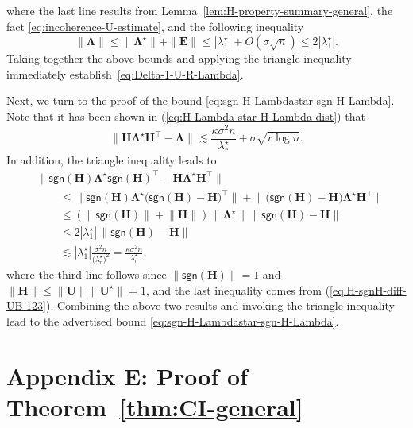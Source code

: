 %
where the last line results from Lemma~\ref{lem:H-property-summary-general}, the fact \eqref{eq:incoherence-U-estimate}, and the following inequality
%
\begin{equation}
	\|\bm{\Lambda}\| \leq \|\bm{\Lambda}^{\star}\| + \|\bm{E}\|\leq |\lambda_1^{\star}| + O(\sigma\sqrt{n}) \leq 2|\lambda_1^{\star}|. 
	\label{eq:Lambda-norm-upper-bound}
\end{equation}
%
Taking together the above bounds and applying the triangle inequality 
immediately establish~\eqref{eq:Delta-1-U-R-Lambda}. 







Next, we turn to the proof of the bound \eqref{eq:sgn-H-Lambdastar-sgn-H-Lambda}. 
Note that it has been shown in (\ref{eq:H-Lambda-star-H-Lambda-dist}) that
%
\[
\big\|\bm{H}\bm{\Lambda}^{\star}\bm{H}^{\top}-\bm{\Lambda}\big\|\lesssim\frac{\kappa\sigma^{2}n}{\lambda_{r}^{\star}}+\sigma\sqrt{r\log n}.
\]
%
In addition, the triangle inequality leads to
%
\begin{align*}
 & \big\|\mathsf{sgn}(\bm{H})\bm{\Lambda}^{\star}\mathsf{sgn}(\bm{H})^{\top}-\bm{H}\bm{\Lambda}^{\star}\bm{H}^{\top}\big\|\\
 & \qquad\leq\big\|\mathsf{sgn}(\bm{H})\bm{\Lambda}^{\star}\big(\mathsf{sgn}(\bm{H})-\bm{H}\big)^{\top}\big\|+\big\|\big(\mathsf{sgn}(\bm{H})-\bm{H}\big)\bm{\Lambda}^{\star}\bm{H}^{\top}\big\|\\
 & \qquad\leq\left(\big\|\mathsf{sgn}(\bm{H})\big\|+\big\|\bm{H}\big\|\right)\,\big\|\bm{\Lambda}^{\star}\big\|\,\big\|\mathsf{sgn}(\bm{H})-\bm{H}\big\|\\
 & \qquad\leq  2 |\lambda_{1}^{\star}| \, \big\|\mathsf{sgn}(\bm{H})-\bm{H}\big\|\\
 & \qquad\lesssim |\lambda_{1}^{\star}| \frac{\sigma^{2}n}{\big(\lambda_{r}^{\star}\big)^{2}}=\frac{\kappa\sigma^{2}n}{\lambda_{r}^{\star}},
\end{align*}
%
where the third line follows since $\big\|\mathsf{sgn}(\bm{H})\big\|=1$
and $\|\bm{H}\|\leq\|\bm{U}\|\|\bm{U}^{\star}\|=1$, and the last
inequality comes from (\ref{eq:H-sgnH-diff-UB-123}). Combining
the above two results and invoking the triangle inequality lead to
the advertised bound \eqref{eq:sgn-H-Lambdastar-sgn-H-Lambda}. 





\section{Appendix E: Proof of Theorem~\ref{thm:CI-general}} 
\label{sec:proof-thm:CI-general}


